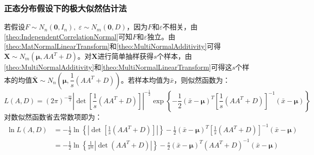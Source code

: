 \subsubsection{正态分布假设下的极大似然估计法}
\begin{derivation}
	若假设$F\sim N_n(\mathbf{0},I_n),\;\varepsilon\sim N_m(\mathbf{0},D)$，因为$F$和$\varepsilon$不相关，由\cref{theo:IndependentCorrelationNormal}可知$F$和$\varepsilon$独立。由\cref{theo:MatNormalLinearTransform}和\cref{theo:MultiNormalAdditivity}可得$\mathbf{X}\sim N_m(\boldsymbol{\mu},AA^T+D)$。对$\mathbf{X}$进行简单抽样获得$s$个样本，由\cref{theo:MultiNormalAdditivity}和\cref{theo:MultiNormalLinearTransform}可得这$s$个样本的均值$\bar{\mathbf{X}}\sim N_n\left(\boldsymbol{\mu},\dfrac{1}{s}(AA^T+D)\right)$。若样本均值为$\bar{x}$，则似然函数为：
	\begin{equation*}
		L(A,D)=(2\pi)^{-\frac{m}{2}}|\det[\frac{1}{s}(AA^T+D)]|^{-\frac{1}{2}}\exp\left\{-\frac{1}{2}(\bar{x}-\boldsymbol{\mu})^T\left[\frac{1}{s}(AA^T+D)\right]^{-1}(\bar{x}-\boldsymbol{\mu})\right\}
	\end{equation*}
	对数似然函数省去常数项即为：
	\begin{align*}
		\ln L(A,D)&=-\frac{1}{2}\ln\left\{\left|\det\left[\frac{1}{s}(AA^T+D)\right]\right|\right\}-\frac{1}{2}(\bar{x}-\boldsymbol{\mu})^T\left[\frac{1}{s}(AA^T+D)\right]^{-1}(\bar{x}-\boldsymbol{\mu}) \\
		&=-\frac{1}{2}\ln\left\{\frac{1}{s^m}\left|\det(AA^T+D)\right|\right\}-\frac{s}{2}(\bar{x}-\boldsymbol{\mu})^T(AA^T+D)^{-1}(\bar{x}-\boldsymbol{\mu})
	\end{align*}
\end{derivation}

